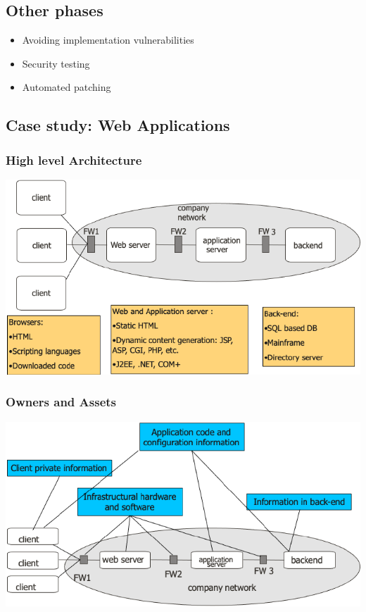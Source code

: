 \subsection{Other phases}
\begin{itemize}
    \item Avoiding implementation vulnerabilities
    \item Security testing
    \item Automated patching
\end{itemize}

\subsection{Case study: Web Applications}
\subsubsection{High level Architecture}
\includegraphics[width=\linewidth]{../img/web_application.png}
\subsubsection{Owners and Assets}
\includegraphics[width=\linewidth]{../img/web_application_owners_assets.png}
